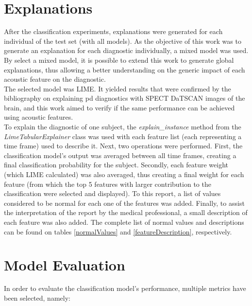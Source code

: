 \section{Explanations}

After the classification experiments, explanations were generated for each individual of the test set (with all models). As the objective of this work was to generate an explanation for each diagnostic individually, a mixed model was used. By select a mixed model, it is possible to extend this work to generate global explanations, thus allowing a better understanding on the generic impact of each acoustic feature on the diagnostic.
\\
The selected model was LIME. It yielded results that were confirmed by the bibliography on explaining \gls{pd} diagnostics with SPECT DaTSCAN images of the brain, and this work aimed to verify if the same performance can be achieved using acoustic features.
\\
To explain the diagnostic of one subject, the \textit{explain\_instance} method from the \textit{LimeTabularExplainer} class was used with each feature list (each representing a time frame) used to describe it. Next, two operations were performed. First, the classification model's output was averaged between all time frames, creating a final classification probability for the subject. Secondly, each feature weight (which LIME calculated) was also averaged, thus creating a final weight for each feature (from which the top 5 features with larger contribution to the classification were selected and displayed). To this report, a list of values considered to be normal for each one of the features was added. Finally, to assist the interpretation of the report by the medical professional, a small description of each feature was also added. The complete list of normal values and descriptions can be found on tables \ref{normalValues} and \ref{featureDescription}, respectively.

\section{Model Evaluation}

In order to evaluate the classification model's performance, multiple metrics have been selected, namely:

